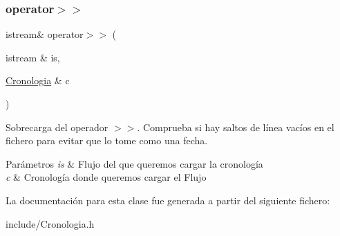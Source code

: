 \subsubsection{\texorpdfstring{operator$>$$>$}{operator>>}}
{\footnotesize\ttfamily istream\& operator$>$$>$ (\begin{DoxyParamCaption}\item[{istream \&}]{is,  }\item[{\hyperlink{classCronologia}{Cronologia} \&}]{c }\end{DoxyParamCaption})\hspace{0.3cm}{\ttfamily [friend]}}



Sobrecarga del operador $>$$>$. Comprueba si hay saltos de línea vacíos en el fichero para evitar que lo tome como una fecha. 


\begin{DoxyParams}{Parámetros}
{\em is} & Flujo del que queremos cargar la cronología \\
\hline
{\em c} & Cronología donde queremos cargar el Flujo \\
\hline
\end{DoxyParams}


La documentación para esta clase fue generada a partir del siguiente fichero\+:\begin{DoxyCompactItemize}
\item 
include/Cronologia.\+h\end{DoxyCompactItemize}
